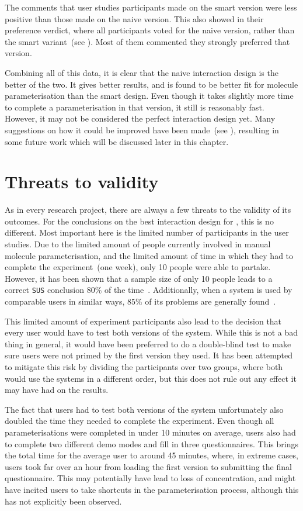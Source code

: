 The comments that user studies participants made on the smart version were less positive than those made on the naive version. This also showed in their preference verdict, where all participants voted for the naive version, rather than the smart variant~(see ). Most of them commented they strongly preferred that version.

Combining all of this data, it is clear that the naive interaction design is the better of the two. It gives better results, and is found to be better fit for molecule parameterisation than the smart design. Even though it takes slightly more time to complete a parameterisation in that version, it still is reasonably fast. However, it may not be considered the perfect interaction design yet. Many suggestions on how it could be improved have been made~(see ), resulting in some future work which will be discussed later in this chapter.


\section{Threats to validity}
As in every research project, there are always a few threats to the validity of its outcomes. For the conclusions on the best interaction design for \oframp, this is no different. Most important here is the limited number of participants in the user studies. Due to the limited amount of people currently involved in manual molecule parameterisation, and the limited amount of time in which they had to complete the experiment~(one week), only 10 people were able to partake. However, it has been shown that a sample size of only 10 people leads to a correct \verb|SUS| conclusion $80\%$ of the time~\cite{tullis2004comparison}. Additionally, when a system is used by comparable users in similar ways, $85\%$ of its problems are generally found~\cite{nielsen2000you}.

This limited amount of experiment participants also lead to the decision that every user would have to test both versions of the system. While this is not a bad thing in general, it would have been preferred to do a double-blind test to make sure users were not primed by the first version they used. It has been attempted to mitigate this risk by dividing the participants over two groups, where both would use the systems in a different order, but this does not rule out any effect it may have had on the results.

The fact that users had to test both versions of the system unfortunately also doubled the time they needed to complete the experiment. Even though all parameterisations were completed in under 10 minutes on average, users also had to complete two different demo modes and fill in three questionnaires. This brings the total time for the average user to around 45 minutes, where, in extreme cases, users took far over an hour from loading the first version to submitting the final questionnaire. This may potentially have lead to loss of concentration, and might have incited users to take shortcuts in the parameterisation process, although this has not explicitly been observed.


